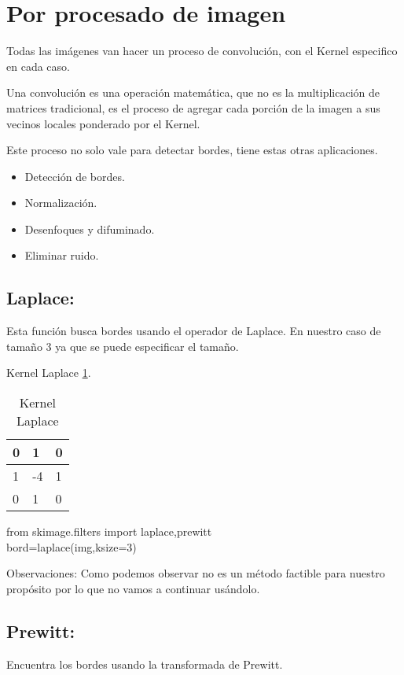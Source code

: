 
\section{Por procesado de imagen}
Todas las imágenes van hacer un proceso de convolución, con el Kernel especifico en cada caso.

Una convolución es una operación matemática, que no es la multiplicación de matrices tradicional, es el proceso de agregar cada porción de la imagen a sus vecinos locales ponderado por el Kernel. 

Este proceso no solo vale para detectar bordes, tiene estas otras aplicaciones.
\begin{itemize}
\item Detección de bordes.
\item Normalización.
\item Desenfoques y difuminado.
\item Eliminar ruido. 
\end{itemize}

\subsection{Laplace:}
Esta función busca bordes usando el operador de Laplace. En nuestro caso de tamaño 3 ya que se puede especificar el tamaño.

Kernel Laplace \ref{F_k1}.
\begin{table}[]
	\centering
	\caption{Kernel Laplace}
	\label{F_k1}
	\begin{tabular}{|l|l|l|}
		\hline
		0 & 1  & 0 \\ \hline
		1 & -4 & 1 \\ \hline
		0 & 1  & 0 \\ \hline
	\end{tabular}
\end{table}

from skimage.filters import laplace,prewitt\\
bord=laplace(img,ksize=3)

Observaciones:
Como podemos observar no es un método factible para nuestro propósito por lo que no vamos a continuar usándolo.

\subsection{Prewitt:}

Encuentra los bordes usando la transformada de Prewitt.

